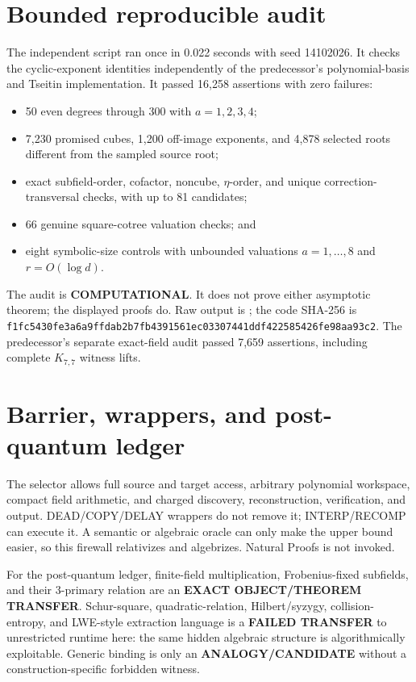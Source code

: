 \documentclass[11pt]{article}
\newcommand{\COMP}{\textbf{COMPUTATIONAL}}
\begin{document}
\section{Bounded reproducible audit}
The independent script
ran once in 0.022 seconds with seed 14102026.  It checks the cyclic-exponent
identities independently of the predecessor's polynomial-basis and Tseitin
implementation.  It passed 16,258 assertions with zero failures:
\begin{itemize}
\item 50 even degrees through 300 with $a=1,2,3,4$;
\item 7,230 promised cubes, 1,200 off-image exponents, and 4,878 selected
roots different from the sampled source root;
\item exact subfield-order, cofactor, noncube, $\eta$-order, and unique
correction-transversal checks, with up to 81 candidates;
\item 66 genuine square-cotree valuation checks; and
\item eight symbolic-size controls with unbounded valuations $a=1,\ldots,8$
and $r=O(\log d)$.
\end{itemize}
The audit is \COMP{}.  It does not prove either asymptotic theorem; the
displayed proofs do.  Raw output is
;
the code SHA-256 is
\texttt{f1fc5430fe3a6a9ffdab2b7fb4391561ec03307441ddf422585426fe98aa93c2}.
The predecessor's separate exact-field audit passed 7,659 assertions,
including complete $K_{7,7}$ witness lifts.

\section{Barrier, wrappers, and post-quantum ledger}
The selector allows full source and target access, arbitrary polynomial
workspace, compact field arithmetic, and charged discovery, reconstruction,
verification, and output.  DEAD/COPY/DELAY wrappers do not remove it;
INTERP/RECOMP can execute it.  A semantic or algebraic oracle can only make
the upper bound easier, so this firewall relativizes and algebrizes.  Natural
Proofs is not invoked.

For the post-quantum ledger, finite-field multiplication, Frobenius-fixed
subfields, and their $3$-primary relation are an \textbf{EXACT
OBJECT/THEOREM TRANSFER}.  Schur-square, quadratic-relation, Hilbert/syzygy,
collision-entropy, and LWE-style extraction language is a \textbf{FAILED
TRANSFER} to unrestricted runtime here: the same hidden algebraic structure
is algorithmically exploitable.  Generic binding is only an
\textbf{ANALOGY/CANDIDATE} without a construction-specific forbidden witness.
\end{document}
